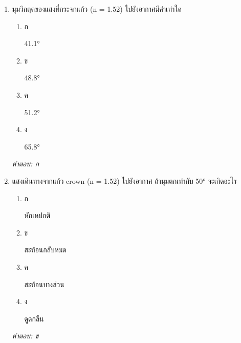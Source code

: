 \documentclass[12pt]{article}
\begin{document}
\begin{enumerate}[label=\arabic*., itemsep=0.5\baselineskip, topsep=0.5\baselineskip, leftmargin=*]
\item มุมวิกฤตของแสงที่กระจกแก้ว (n = 1.52) ไปยังอากาศมีค่าเท่าใด
\begin{enumerate}[label=\alph*)., itemsep=0.3\baselineskip, topsep=0.3\baselineskip]
\item ก\ 
\begin{minipage}[t]{0.9\linewidth}
\raggedright 41.1°
\end{minipage}
\item ข\ 
\begin{minipage}[t]{0.9\linewidth}
\raggedright 48.8°
\end{minipage}
\item ค\ 
\begin{minipage}[t]{0.9\linewidth}
\raggedright 51.2°
\end{minipage}
\item ง\ 
\begin{minipage}[t]{0.9\linewidth}
\raggedright 65.8°
\end{minipage}
\end{enumerate}
\vspace{-0.3\baselineskip}
\begin{small}
\textit{คำตอบ: ก}
\end{small}

\item แสงเดินทางจากแก้ว crown (n = 1.52) ไปยังอากาศ ถ้ามุมตกเท่ากับ 50° จะเกิดอะไร
\begin{enumerate}[label=\alph*)., itemsep=0.3\baselineskip, topsep=0.3\baselineskip]
\item ก\ 
\begin{minipage}[t]{0.9\linewidth}
\raggedright หักเหปกติ
\end{minipage}
\item ข\ 
\begin{minipage}[t]{0.9\linewidth}
\raggedright สะท้อนกลับหมด
\end{minipage}
\item ค\ 
\begin{minipage}[t]{0.9\linewidth}
\raggedright สะท้อนบางส่วน
\end{minipage}
\item ง\ 
\begin{minipage}[t]{0.9\linewidth}
\raggedright ดูดกลืน
\end{minipage}
\end{enumerate}
\vspace{-0.3\baselineskip}
\begin{small}
\textit{คำตอบ: ข}
\end{small}


\end{enumerate}
\end{document}
